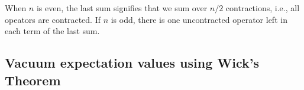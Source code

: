 \documentclass{report}
\theoremstyle{plain}
\theoremstyle{definition}
\newtheorem{exerc}{Exercise}[chapter]
\newcommand\xqed[1]{%
  \leavevmode\unskip\penalty9999 \hbox{}\nobreak\hfill
  \quad\hbox{#1}}
\newcommand\demo{\xqed{$\triangle$}}
\newenvironment{exercise}{\bigskip\begin{exerc}}{\demo\end{exerc}\bigskip}
\begin{document}
When $n$ is even, the last sum signifies that we sum
over $n/2$ contractions, i.e., all opeators are contracted. If $n$ is
odd, there is one uncontracted operator left in each term of the last
sum.

\subsection{Vacuum expectation values using Wick's Theorem}
\end{document}
